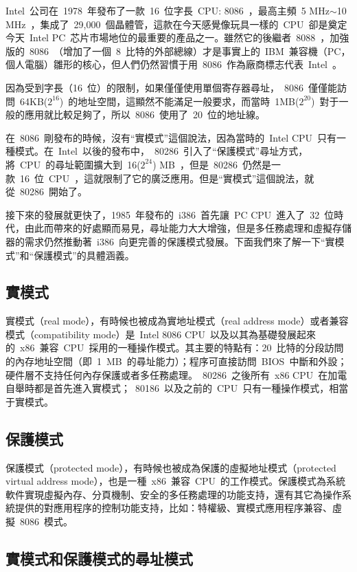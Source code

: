 Intel~公司在~1978~年發布了一款~16~位字長~CPU: 8086~，最高主頻~5 MHz$\sim$10 MHz~，集成了~29,000~個晶體管，這款在今天感覺像玩具一樣的~CPU~卻是奠定今天~Intel PC~芯片市場地位的最重要的產品之一。雖然它的後繼者~8088~，加強版的~8086~（增加了一個~8~比特的外部總線）才是事實上的~IBM~兼容機（PC，個人電腦）雛形的核心，但人們仍然習慣于用~8086~作為廠商標志代表~Intel~。

因為受到字長（16~位）的限制，如果僅僅使用單個寄存器尋址，~8086~僅僅能訪問~64KB($2^{16}$)~的地址空間，這顯然不能滿足一般要求，而當時~1MB($2^{20}$)~對于一般的應用就比較足夠了，所以~8086~使用了~20~位的地址線。

在~8086~剛發布的時候，沒有“實模式”這個說法，因為當時的~Intel CPU~只有一種模式。在~Intel~以後的發布中，~80286~引入了“保護模式”尋址方式，將~CPU~的尋址範圍擴大到~16($2^{24}$) MB~，但是~80286~仍然是一款~16~位~CPU~，這就限制了它的廣泛應用。但是“實模式”這個說法，就從~80286~開始了。

接下來的發展就更快了，1985~年發布的~i386~首先讓~PC CPU~進入了~32~位時代，由此而帶來的好處顯而易見，尋址能力大大增強，但是多任務處理和虛擬存儲器的需求仍然推動著~i386~向更完善的保護模式發展。下面我們來了解一下“實模式”和“保護模式”的具體涵義。

\subsection{實模式}

實模式（real mode），有時候也被成為實地址模式（real address mode）或者兼容模式（compatibility mode）是~Intel 8086 CPU~以及以其為基礎發展起來的~x86~兼容~CPU~採用的一種操作模式。其主要的特點有：20~比特的分段訪問的內存地址空間（即~1~MB~的尋址能力）；程序可直接訪問~BIOS~中斷和外設；硬件層不支持任何內存保護或者多任務處理。~80286~之後所有~x86 CPU~在加電自舉時都是首先進入實模式；~80186~以及之前的~CPU~只有一種操作模式，相當于實模式。

\subsection{保護模式}

保護模式（protected mode），有時候也被成為保護的虛擬地址模式（protected virtual address mode），也是一種~x86~兼容~CPU~的工作模式。保護模式為系統軟件實現虛擬內存、分頁機制、安全的多任務處理的功能支持，還有其它為操作系統提供的對應用程序的控制功能支持，比如：特權級、實模式應用程序兼容、虛擬~8086~模式。

\subsection{實模式和保護模式的尋址模式}

